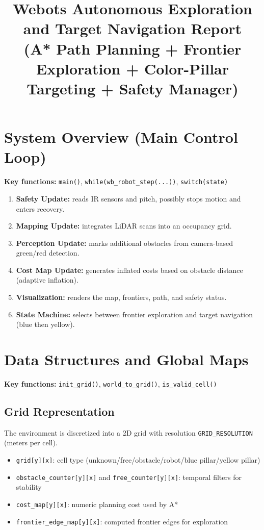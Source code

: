 \documentclass[12pt,a4paper]{article}
\title{\textbf{Webots Autonomous Exploration and Target Navigation Report}\\
\large (A* Path Planning + Frontier Exploration + Color-Pillar Targeting + Safety Manager)}
\begin{document}
\maketitle

\tableofcontents
\newpage

\section{System Overview (Main Control Loop)}
\textbf{Key functions:} \texttt{main()}, \texttt{while(wb\_robot\_step(...))}, \texttt{switch(state)}

\begin{enumerate}[leftmargin=2em]
  \item \textbf{Safety Update:} reads IR sensors and pitch, possibly stops motion and enters recovery.
  \item \textbf{Mapping Update:} integrates LiDAR scans into an occupancy grid.
  \item \textbf{Perception Update:} marks additional obstacles from camera-based green/red detection.
  \item \textbf{Cost Map Update:} generates inflated costs based on obstacle distance (adaptive inflation).
  \item \textbf{Visualization:} renders the map, frontiers, path, and safety status.
  \item \textbf{State Machine:} selects between frontier exploration and target navigation (blue then yellow).
\end{enumerate}

\section{Data Structures and Global Maps}
\textbf{Key functions:} \texttt{init\_grid()}, \texttt{world\_to\_grid()}, \texttt{is\_valid\_cell()}

\subsection{Grid Representation}
The environment is discretized into a 2D grid with resolution \texttt{GRID\_RESOLUTION} (meters per cell).
\begin{itemize}[leftmargin=2em]
  \item \texttt{grid[y][x]}: cell type (unknown/free/obstacle/robot/blue pillar/yellow pillar)
  \item \texttt{obstacle\_counter[y][x]} and \texttt{free\_counter[y][x]}: temporal filters for stability
  \item \texttt{cost\_map[y][x]}: numeric planning cost used by A*
  \item \texttt{frontier\_edge\_map[y][x]}: computed frontier edges for exploration
\end{itemize}
\end{document}

